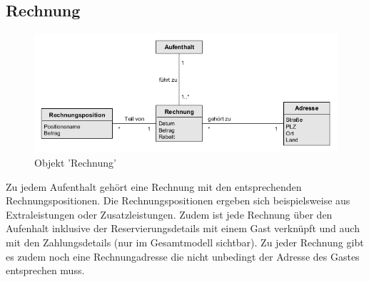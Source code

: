 \documentclass[../../Pflichtenheft.tex]{subfiles}
\begin{document}
    \subsection{Rechnung}
    \begin{figure}[ht!]
        \begin{center}
            \includegraphics[width=0.5\linewidth]{assets/rechnung.png}
            \caption{Objekt 'Rechnung'} \label{rechnung_model}
        \end{center}
    \end{figure}
    Zu jedem Aufenthalt gehört eine Rechnung mit den entsprechenden Rechnungspositionen.
    Die Rechnungspositionen ergeben sich beispielsweise aus Extraleistungen oder Zusatzleistungen.
    Zudem ist jede Rechnung über den Aufenhalt inklusive der Reservierungsdetails mit einem Gast verknüpft und auch mit den Zahlungsdetails (nur
    im Gesamtmodell sichtbar). Zu jeder Rechnung gibt es zudem noch eine Rechnungadresse die nicht unbedingt
    der Adresse des Gastes entsprechen muss.
\end{document}
